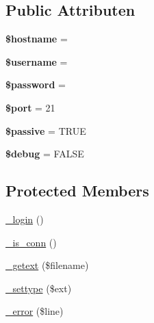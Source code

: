 \subsection*{Public Attributen}
\begin{DoxyCompactItemize}
\item 
\mbox{\label{class_c_i___f_t_p_a8bf9ffb42ed554b203b55377d1fc9aa4}} 
{\bfseries \$hostname} = \textquotesingle{}\textquotesingle{}
\item 
\mbox{\label{class_c_i___f_t_p_a0eb82aa5f81cf845de4b36cd653c42cf}} 
{\bfseries \$username} = \textquotesingle{}\textquotesingle{}
\item 
\mbox{\label{class_c_i___f_t_p_a607686ef9f99ea7c42f4f3dd3dbb2b0d}} 
{\bfseries \$password} = \textquotesingle{}\textquotesingle{}
\item 
\mbox{\label{class_c_i___f_t_p_aa0787efab4b22e8a212882f3409d4c77}} 
{\bfseries \$port} = 21
\item 
\mbox{\label{class_c_i___f_t_p_a9fb61732ea9189fa2be5574ad3576d9c}} 
{\bfseries \$passive} = T\+R\+UE
\item 
\mbox{\label{class_c_i___f_t_p_a85ae3e64cd40e9564adceb010085e9dd}} 
{\bfseries \$debug} = F\+A\+L\+SE
\end{DoxyCompactItemize}
\subsection*{Protected Members}
\begin{DoxyCompactItemize}
\item 
\mbox{\hyperlink{class_c_i___f_t_p_a95562e7b8a41561f4b0b525d9c7fe701}{\+\_\+login}} ()
\item 
\mbox{\hyperlink{class_c_i___f_t_p_af20c08e4b61fe028e032b388cd73936a}{\+\_\+is\+\_\+conn}} ()
\item 
\mbox{\hyperlink{class_c_i___f_t_p_ab06ef33f96f03cafbb8f2bb6d695ef1f}{\+\_\+getext}} (\$filename)
\item 
\mbox{\hyperlink{class_c_i___f_t_p_aacd9d6628615078d8df9aab1fe70e391}{\+\_\+settype}} (\$ext)
\item 
\mbox{\hyperlink{class_c_i___f_t_p_ac618e7d56614851d2c54aa096e1bcace}{\+\_\+error}} (\$line)
\end{DoxyCompactItemize}

